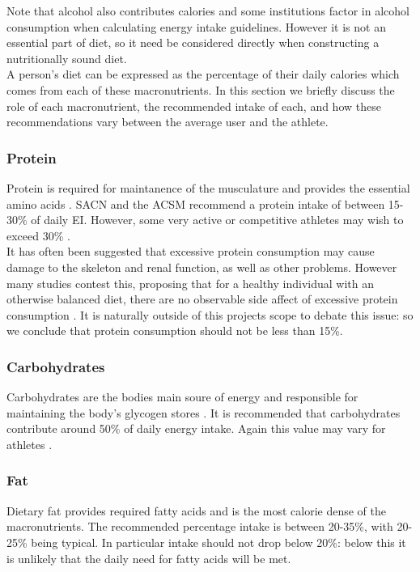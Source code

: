 Note that alcohol also contributes calories and some institutions factor in alcohol consumption when calculating energy intake guidelines. However it is not an essential part of diet, so it need be considered directly when constructing a nutritionally sound diet.\\
A person's diet can be expressed as the percentage of their daily calories which comes from each of these macronutrients. In this section we briefly discuss the role of each macronutrient, the recommended intake of each, and how these recommendations vary between the average user and the athlete.

\subsubsection{Protein}
Protein is required for maintanence of the musculature and provides the essential amino acids \cite[ch.~15]{FoodIntakeAndEnergy}. SACN and the ACSM recommend a protein intake of between 15-30\% of daily EI. However, some very active or competitive athletes may wish to exceed 30\% \cite{ACSMNutritionForAthletes}.\\
It has often been suggested that excessive protein consumption may cause damage to the skeleton and renal function, as well as other problems\cite{ProteinCanAffectBone}. However many studies contest this, proposing that for a healthy individual with an otherwise balanced diet, there are no observable side affect of excessive protein consumption \cite{ProteinNotAffectBone,ProteinNotAffectRenal}. It is naturally outside of this projects scope to debate this issue: so we conclude that protein consumption should not be less than 15\%.

\subsubsection{Carbohydrates}
Carbohydrates are the bodies main soure of energy and responsible for maintaining the body's glycogen stores \cite[ch.~15]{FoodIntakeAndEnergy}. It is recommended that carbohydrates contribute around 50\% of daily energy intake. Again this value may vary for athletes \cite{ACSMNutritionForAthletes}.

\subsubsection{Fat}
Dietary fat provides required fatty acids and is the most calorie dense of the macronutrients. The recommended percentage intake is between 20-35\%, with 20-25\% being typical. In particular intake should not drop below 20\%: below this it is unlikely that the daily need for fatty acids will be met.

	







